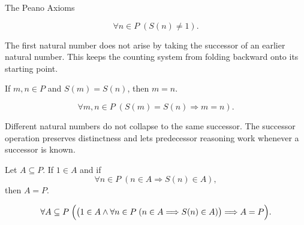 \begin{topicbox}{The Peano Axioms}
\begin{remark*}
\[
\forall n \in P\;(S(n) \neq 1).
\]
\end{remark*}

\begin{remark*}[Interpretation]
The first natural number does not arise by taking the successor of an earlier
natural number. This keeps the counting system from folding backward onto its
starting point.
\end{remark*}

\NoLocalDependencies

\begin{tcolorbox}[colback=axiombox, colframe=axiomborder, arc=2pt,
  left=6pt, right=6pt, top=4pt, bottom=4pt,
  title={\small\textbf{Axiom (Injectivity of Successor)}},
  fonttitle=\small\bfseries]
\begin{axiom}
\label{ax:peano-successor-injective}
If $m,n \in P$ and $S(m)=S(n)$, then $m=n$.
\end{axiom}
\end{tcolorbox}

\begin{remark*}
\[
\forall m,n \in P\;(S(m)=S(n) \Longrightarrow m=n).
\]
\end{remark*}

\begin{remark*}[Interpretation]
Different natural numbers do not collapse to the same successor. The successor
operation preserves distinctness and lets predecessor reasoning work whenever a
successor is known.
\end{remark*}

\NoLocalDependencies

\begin{tcolorbox}[colback=axiombox, colframe=axiomborder, arc=2pt,
  left=6pt, right=6pt, top=4pt, bottom=4pt,
  title={\small\textbf{Axiom (Induction Axiom)}},
  fonttitle=\small\bfseries]
\begin{axiom}
\label{ax:peano-induction}
Let $A \subseteq P$. If $1 \in A$ and if
\[
\forall n \in P\;(n \in A \Longrightarrow S(n) \in A),
\]
then $A=P$.
\end{axiom}
\end{tcolorbox}

\begin{remark*}
\[
\forall A \subseteq P\;
\Bigl(\bigl(1 \in A \land
\forall n \in P\;(n \in A \Longrightarrow S(n) \in A)\bigr)
\Longrightarrow A=P\Bigr).
\]
\end{remark*}


\end{topicbox}
